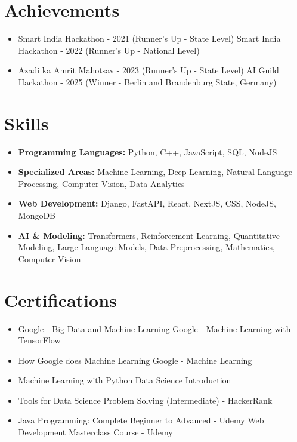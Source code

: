 \documentclass[a4paper,10pt]{article}
\begin{document}
\section*{Achievements}
\begin{itemize}
\item Smart India Hackathon - 2021 (Runner's Up - State Level) \hfill Smart India Hackathon - 2022 (Runner's Up - National Level)
\item Azadi ka Amrit Mahotsav - 2023 (Runner's Up - State Level) \hfill AI Guild Hackathon - 2025 (Winner - Berlin and Brandenburg State, Germany)
\end{itemize}

\section*{Skills}
\begin{itemize}
  \item \textbf{Programming Languages:} Python, C++, JavaScript, SQL, NodeJS
  \item \textbf{Specialized Areas:} Machine Learning, Deep Learning, Natural Language Processing, Computer Vision, Data Analytics
  \item \textbf{Web Development:} Django, FastAPI, React, NextJS, CSS, NodeJS, MongoDB
  \item \textbf{AI \& Modeling:} Transformers, Reinforcement Learning, Quantitative Modeling, Large Language Models, Data Preprocessing, Mathematics, Computer Vision
\end{itemize}

\section*{Certifications}
\begin{itemize}
\item Google - Big Data and Machine Learning \hfill Google - Machine Learning with TensorFlow
\item How Google does Machine Learning \hfill Google - Machine Learning
\item Machine Learning with Python \hfill Data Science Introduction
\item Tools for Data Science \hfill Problem Solving (Intermediate) - HackerRank
\item Java Programming: Complete Beginner to Advanced - Udemy \hfill Web Development Masterclass Course - Udemy
\end{itemize}
\end{document}
